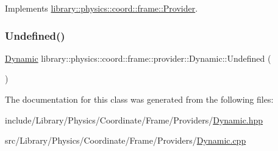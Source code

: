 Implements \hyperlink{classlibrary_1_1physics_1_1coord_1_1frame_1_1_provider_ae7cd093febf2b20f71400f9f79442774}{library\+::physics\+::coord\+::frame\+::\+Provider}.

\mbox{\label{classlibrary_1_1physics_1_1coord_1_1frame_1_1provider_1_1_dynamic_a1784249ac5b9abb8562316940998aa2e}} 
\subsubsection{\texorpdfstring{Undefined()}{Undefined()}}
{\footnotesize\ttfamily \hyperlink{classlibrary_1_1physics_1_1coord_1_1frame_1_1provider_1_1_dynamic}{Dynamic} library\+::physics\+::coord\+::frame\+::provider\+::\+Dynamic\+::\+Undefined (\begin{DoxyParamCaption}{ }\end{DoxyParamCaption})\hspace{0.3cm}{\ttfamily [static]}}



The documentation for this class was generated from the following files\+:\begin{DoxyCompactItemize}
\item 
include/\+Library/\+Physics/\+Coordinate/\+Frame/\+Providers/\hyperlink{_dynamic_8hpp}{Dynamic.\+hpp}\item 
src/\+Library/\+Physics/\+Coordinate/\+Frame/\+Providers/\hyperlink{_dynamic_8cpp}{Dynamic.\+cpp}\end{DoxyCompactItemize}
